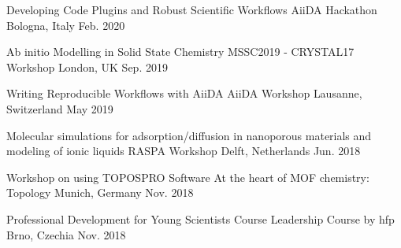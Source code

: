 

\begin{cventries}

    \cventrynodescr
        {Developing Code Plugins and Robust Scientific Workflows} %
        {AiiDA Hackathon} %
        {Bologna, Italy} %
        {Feb. 2020} %
    
    \cventrynodescr
        {Ab initio Modelling in Solid State Chemistry} %
        {MSSC2019 - CRYSTAL17 Workshop} %
        {London, UK} %
        {Sep. 2019} %
    
    \cventrynodescr
        {Writing Reproducible Workflows with AiiDA} %
        {AiiDA Workshop} %
        {Lausanne, Switzerland} %
        {May 2019} %
    
    \cventrynodescr
        {Molecular simulations for adsorption/diffusion in nanoporous materials and modeling of ionic liquids} %
        {RASPA Workshop} %
        {Delft, Netherlands} %
        {Jun. 2018} %
    
    \cventrynodescr
        {Workshop on using TOPOSPRO Software} %
        {At the heart of MOF chemistry: Topology} %
        {Munich, Germany} %
        {Nov. 2018} %
    
    \cventrynodescr
        {Professional Development for Young Scientists Course} %
        {Leadership Course by hfp} %
        {Brno, Czechia} %
        {Nov. 2018} %

\end{cventries}
